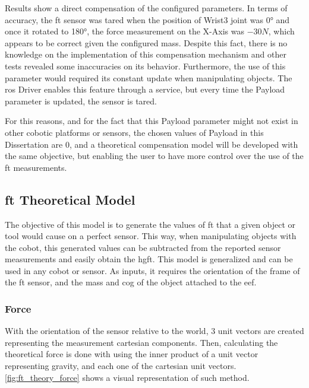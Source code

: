 \par Results show a direct compensation of the configured parameters. In terms of accuracy, the \ac{ft} sensor was tared when the position of Wrist3 joint was \ang{0} and once it rotated to \ang{180}, the force measurement on the X-Axis was $-30\si{N}$, which appears to be correct given the configured mass. Despite this fact, there is no knowledge on the implementation of this compensation mechanism and other tests revealed some inaccuracies on its behavior. Furthermore, the use of this parameter would required its constant update when manipulating objects. The \ac{ros} Driver enables this feature through a service, but every time the Payload parameter is updated, the sensor is tared. 
\par For this reasons, and for the fact that this Payload parameter might not exist in other cobotic platforms or sensors, the chosen values of Payload in this Dissertation are 0, and a theoretical compensation model will be developed with the same objective, but enabling the user to have more control over the use of the \ac{ft} measurements.

\subsection{\acs{ft} Theoretical Model}
\label{ssec:ft_model}

\par The objective of this model is to generate the values of \ac{ft} that a given object or tool would cause on a perfect sensor. This way, when manipulating objects with the cobot, this generated values can be subtracted from the reported sensor measurements and easily obtain the \ac{hgft}. This model is generalized and can be used in any cobot or sensor. As inputs, it requires the orientation of the frame of the \ac{ft} sensor, and the mass and \ac{cog} of the object attached to the \ac{eef}.

\subsubsection{Force}

\par With the orientation of the sensor relative to the world, 3 unit vectors are created representing the measurement cartesian components. Then, calculating the theoretical force is done with using the inner product of a unit vector representing gravity, and each one of the cartesian unit vectors. \autoref{fig:ft_theory_force} shows a visual representation of such method.

